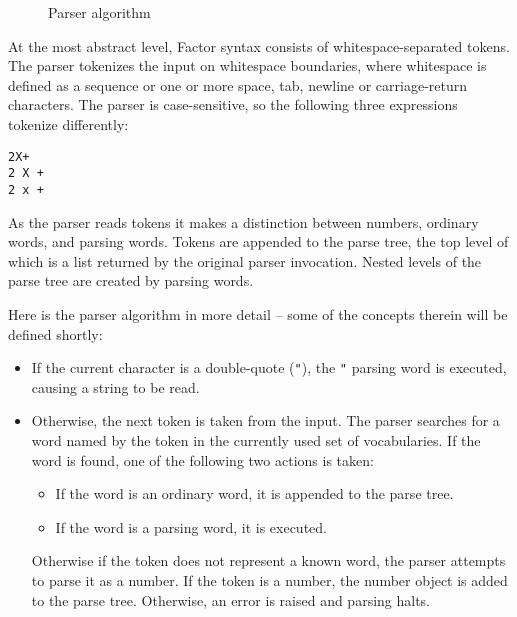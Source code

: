 \documentclass{report}
\begin{document}
\begin{figure}
\caption{Parser algorithm}
\begin{center}
\end{center}
\end{figure}

At the most abstract level,
Factor syntax consists of whitespace-separated tokens. The parser tokenizes the input on whitespace boundaries, where whitespace is defined as a sequence or one or more space, tab, newline or carriage-return characters.  The parser is case-sensitive, so
the following three expressions tokenize differently:
\begin{verbatim}
2X+
2 X +
2 x +
\end{verbatim}
As the parser reads tokens it makes a distinction between numbers, ordinary words, and
parsing words. Tokens are appended to the parse tree, the top level of which is a list
returned by the original parser invocation. Nested levels of the parse tree are created
by parsing words.

Here is the parser algorithm in more detail -- some of the concepts therein will be defined shortly:

\begin{itemize}
\item If the current character is a double-quote (\texttt{"}), the \texttt{"} parsing word is executed, causing a string to be read.
\item Otherwise, the next token is taken from the input. The parser searches for a word named by the token in the currently used set of vocabularies. If the word is found, one of the following two actions is taken:
\begin{itemize}
\item If the word is an ordinary word, it is appended to the parse tree.
\item If the word is a parsing word, it is executed.
\end{itemize}
Otherwise if the token does not represent a known word, the parser attempts to parse it as a number. If the token is a number, the number object is added to the parse tree. Otherwise, an error is raised and parsing halts.
\end{itemize}

\end{document}
